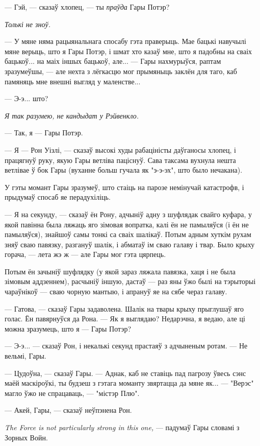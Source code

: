 --- Гэй, --- сказаў хлопец, --- ты \emph{праўда} Гары Потэр?

\emph{Толькі не зноў.} 

--- У мяне няма рацыянальнага спосабу гэта праверыць. Мае бацькі навучылі мяне
верыць, што я Гары Потэр, і шмат хто казаў мне, што я падобны на сваіх бацькоў...
на маіх іншых бацькоў, але... --- Гары нахмурыўся, раптам зразумеўшы, ---
але нехта з лёгкасцю мог прымяныць заклён для таго, каб памяняць мне внешні выгляд
у маленстве...

--- Э-э... што?

\emph{Я так разумею, не кандыдат у Рэйвенкло.}

--- Так, я --- Гары Потэр.

--- Я --- Рон Уізлі, --- сказаў высокі худы рабаціністы даўганосы хлопец, і 
працягнуў руку, якую Гары ветліва паціснуў. Сава таксама вухнула
нешта ветлівае ў бок Гары (вуханне больш гучала як "э-э-эх", што было нечакана).

У гэты момант Гары зразумеў, што стаіць на парозе немінучай катастрофв, і прыдумаў
спосаб яе перадухіліць. 

--- Я на секунду, --- сказаў ён Рону, адчыніў адну з шуфлядак свайго куфара,
у якой павінна была ляжаць яго зімовая вопратка, калі ён не памыляўся (і ён
не памыляўся), знайшоў самы тонкі са сваіх шалікаў. Потым адным хуткім
рухам зняў сваю павязку, разгануў шалік, і абматаў ім сваю галаву і твар. 
Было крыху горача, --- лета жэ ж --- але Гары мог гэта цярпець.

Потым ён зачыніў шуфлядку (у якой зараз ляжала павязка, хаця і не была зімовым
аддзеннем), расчыніў іншую, дастаў --- раз яны ўжо былі на тэрыторыі чараўнікоў --- 
сваю чорную мантыю, і апрануў яе на сябе чераз галаву.

--- Гатова, --- сказаў Гары задаволена. Шалік на твары крыху прыглушаў яго голас. 
Ён павярнуўся да Рона. --- Як я выглядаю? Недарэчна, я ведаю, але ці можна
зразумець, што я --- Гары Потэр? 

--- Э-э... --- сказаў Рон, і некалькі секунд прастаяў з адчыненым ротам.
--- Не вельмі, Гары.

--- Цудоўна, --- сказаў Гары. --- Аднак, каб не ставіць пад пагрозу ўвесь сэнс маёй 
маскіроўкі, ты будзеш з гэтага моманту звяртацца да мяне як... --- "Верэс" магло
ўжо не спрацаваць, --- "містэр Плю".

--- Акей, Гары, --- сказаў неўпэнена Рон.

\emph{The Force is not particularly strong in this one,} --- падумаў Гары словамі 
з Зорных Войн. 

